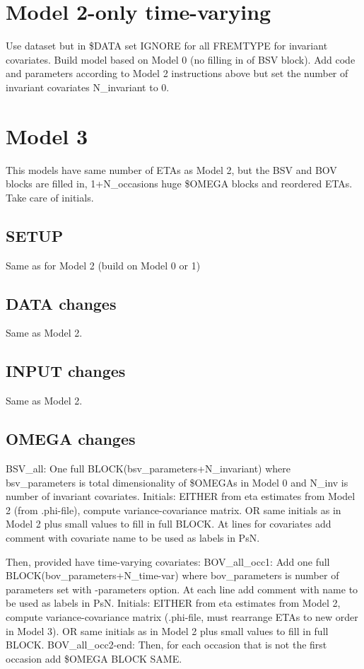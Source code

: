 \section{Model 2-only time-varying}
Use dataset but in \$DATA set IGNORE for all FREMTYPE for invariant covariates. Build model based on Model 0 (no filling in of BSV block). Add code and parameters according to Model 2 instructions above but set the number of invariant covariates N\_invariant to 0.

\section{Model 3}

This models have same number of ETAs as Model 2, but the BSV and BOV blocks are filled in, 1+N\_occasions huge \$OMEGA blocks and reordered ETAs. Take care of initials.

\subsection{SETUP}
Same as for Model 2 (build on Model 0 or 1)

\subsection{DATA changes}
Same as Model 2.
\subsection{INPUT changes}
Same as Model 2.

\subsection{OMEGA changes}
BSV\_all: One full BLOCK(bsv\_parameters+N\_invariant) where bsv\_parameters is total dimensionality of \$OMEGAs in Model 0 and N\_inv is number of invariant covariates.
Initials: EITHER from eta estimates from Model 2 (from .phi-file), compute variance-covariance matrix. OR same initials as in Model 2 plus small values to fill in full BLOCK.
At lines for covariates add comment with covariate name to be used as labels in PsN.

Then, provided have time-varying covariates:
BOV\_all\_occ1: Add one full BLOCK(bov\_parameters+N\_time-var) where bov\_parameters is number of parameters set with -parameters option.
At each line add comment with name to be used as labels in PsN.
Initials: EITHER from eta estimates from Model 2, compute variance-covariance matrix (.phi-file, must rearrange ETAs to new order in Model 3). OR same initials as in Model 2 plus small values to fill in full BLOCK.
BOV\_all\_occ2-end: Then, for each occasion that is not the first occasion add \$OMEGA BLOCK SAME.

